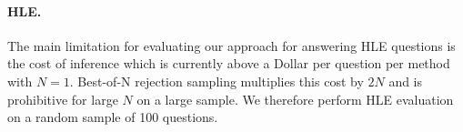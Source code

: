 \paragraph{HLE.} The main limitation for evaluating our approach for answering HLE questions is the cost of inference which is currently above a Dollar per question per method with $N=1$. Best-of-N rejection sampling multiplies this cost by $2N$ and is prohibitive for large $N$ on a large sample. We therefore perform HLE evaluation on a random sample of 100 questions.